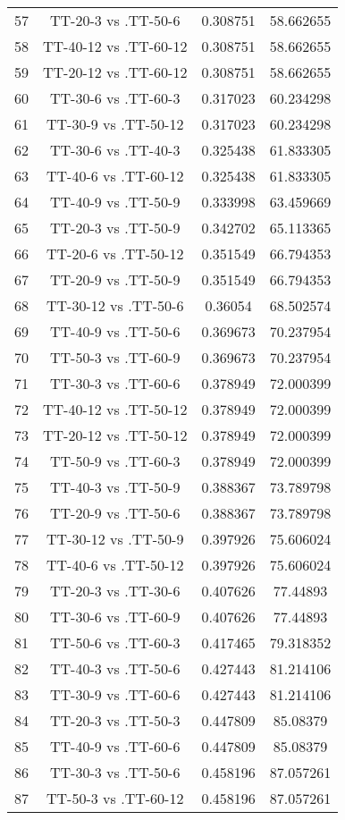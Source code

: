 \documentclass[a4paper,10pt]{article}
\begin{document}
\begin{landscape}
\begin{table}[!htp]
\begin{tabular}{cccc}
57&TT-20-3 vs .TT-50-6&0.308751&58.662655\\
58&TT-40-12 vs .TT-60-12&0.308751&58.662655\\
59&TT-20-12 vs .TT-60-12&0.308751&58.662655\\
60&TT-30-6 vs .TT-60-3&0.317023&60.234298\\
61&TT-30-9 vs .TT-50-12&0.317023&60.234298\\
62&TT-30-6 vs .TT-40-3&0.325438&61.833305\\
63&TT-40-6 vs .TT-60-12&0.325438&61.833305\\
64&TT-40-9 vs .TT-50-9&0.333998&63.459669\\
65&TT-20-3 vs .TT-50-9&0.342702&65.113365\\
66&TT-20-6 vs .TT-50-12&0.351549&66.794353\\
67&TT-20-9 vs .TT-50-9&0.351549&66.794353\\
68&TT-30-12 vs .TT-50-6&0.36054&68.502574\\
69&TT-40-9 vs .TT-50-6&0.369673&70.237954\\
70&TT-50-3 vs .TT-60-9&0.369673&70.237954\\
71&TT-30-3 vs .TT-60-6&0.378949&72.000399\\
72&TT-40-12 vs .TT-50-12&0.378949&72.000399\\
73&TT-20-12 vs .TT-50-12&0.378949&72.000399\\
74&TT-50-9 vs .TT-60-3&0.378949&72.000399\\
75&TT-40-3 vs .TT-50-9&0.388367&73.789798\\
76&TT-20-9 vs .TT-50-6&0.388367&73.789798\\
77&TT-30-12 vs .TT-50-9&0.397926&75.606024\\
78&TT-40-6 vs .TT-50-12&0.397926&75.606024\\
79&TT-20-3 vs .TT-30-6&0.407626&77.44893\\
80&TT-30-6 vs .TT-60-9&0.407626&77.44893\\
81&TT-50-6 vs .TT-60-3&0.417465&79.318352\\
82&TT-40-3 vs .TT-50-6&0.427443&81.214106\\
83&TT-30-9 vs .TT-60-6&0.427443&81.214106\\
84&TT-20-3 vs .TT-50-3&0.447809&85.08379\\
85&TT-40-9 vs .TT-60-6&0.447809&85.08379\\
86&TT-30-3 vs .TT-50-6&0.458196&87.057261\\
87&TT-50-3 vs .TT-60-12&0.458196&87.057261\\

\end{tabular}
\end{table}
\end{landscape}
\end{document}
